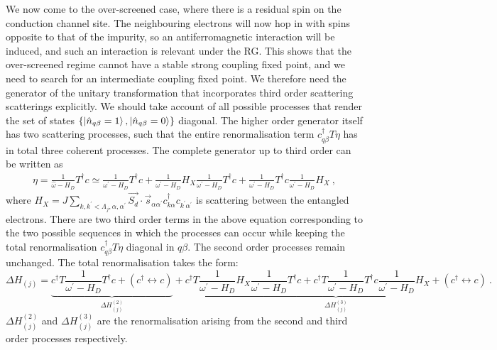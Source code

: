 \documentclass[reprint,onecolumn,prb,superscriptaddress]{revtex4-2}
\begin{document}
We now come to the over-screened case, where there is a residual spin on the conduction channel site. The neighbouring electrons will now hop in with spins opposite to that of the impurity, so an antiferromagnetic interaction will be induced, and such an interaction is relevant under the RG. This shows that the over-screened regime cannot have a stable strong coupling fixed point, and we need to search for an intermediate coupling fixed point. We therefore need the generator of the unitary transformation that incorporates third order scattering scatterings explicitly. We should take account of all possible processes that render the set of states \(\left\{\ket{\hat n_{q\beta}=1},\ket{\hat n_{q\beta}=0}\right\}\) diagonal. The higher order generator itself has two scattering processes, such that the entire renormalisation term \(c^\dagger_{q\beta} T \eta\) has in total three coherent processes. The complete generator up to third order can be written as
\begin{equation}\begin{aligned}
	\eta = \frac{1}{\hat \omega - H_D}T^\dagger c \simeq \frac{1}{\omega^\prime - H_D}T^\dagger c + \frac{1}{\omega^\prime - H_D}H_X \frac{1}{\omega^\prime - H_D} T^\dagger c + \frac{1}{\omega^\prime - H_D} T^\dagger c \frac{1}{\omega^\prime - H_D} H_X~,
\end{aligned}\end{equation}
where \(H_X = J \sum_{k,k^\prime < \Lambda_j, \alpha,\alpha^\prime}\vec{S_d}\cdot\vec{s}_{\alpha \alpha^\prime}c^\dagger_{k\alpha}c_{k^\prime\alpha^\prime}\) is scattering between the entangled electrons. There are two third order terms in the above equation corresponding to the two possible sequences in which the processes can occur while keeping the total renormalisation \(c^\dagger_{q\beta}T \eta\) diagonal in \(q\beta\). The second order processes remain unchanged. The total renormalisation takes the form:
\begin{equation}
	\label{full_ren}
	\Delta H_{(j)} = \underbrace{c^\dagger T \frac{1}{\omega^\prime - H_D} T^\dagger c  + \left(c^\dagger \leftrightarrow c\right)}_{\Delta H^{(2)}_{(j)}} + \underbrace{c^\dagger T \frac{1}{\omega^\prime - H_D} H_X \frac{1}{\omega^\prime - H_D} T^\dagger c + c^\dagger T \frac{1}{\omega^\prime - H_D} T^\dagger c \frac{1}{\omega^\prime - H_D} H_X + \left(c^\dagger \leftrightarrow c\right)}_{\Delta H^{(3)}_{(j)}}~.
\end{equation}
\(\Delta H^{(2)}_{(j)}\) and \(\Delta H^{(3)}_{(j)}\) are the renormalisation arising from the second and third order processes respectively.
\end{document}
